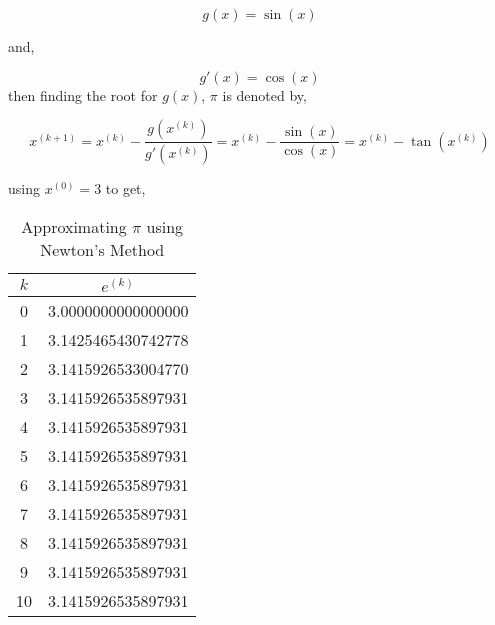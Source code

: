 \documentclass{article}
\begin{document}
\begin{equation*}
    g(x) = \sin(x)
\end{equation*}

and,

\begin{equation*}
    g'(x) = \cos(x)
\end{equation*}
then finding the root for $g(x)$, $\pi$ is denoted by,

\begin{equation*}
    x^{(k+1)} = x^{(k)} - \frac{g(x^{(k)})}{g'(x^{(k)})} = x^{(k)} - \frac{\sin(x)}{ \cos(x)} = x^{(k)} - \tan(x^{(k)})
\end{equation*}

using $x^{(0)} = 3$ to get,

\begin{table}[H]
    \centering
    \begin{tabular}{c|c}
        $k$ &  $e^{(k)}$ \\
        \hline{} 0 &  3.0000000000000000\\
        1 & 3.1425465430742778\\
        2 & 3.1415926533004770\\
        3 & 3.1415926535897931\\
        4 & 3.1415926535897931 \\
        5 & 3.1415926535897931\\
        6 &  3.1415926535897931
\\
        7 & 3.1415926535897931\\
        8 & 3.1415926535897931\\
        9 &3.1415926535897931\\
        10 &3.1415926535897931
        
    \end{tabular}
    \caption{Approximating $\pi$ using Newton's Method}
    \label{tab:my_label}
\end{table}
\end{document}
